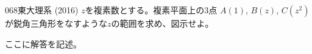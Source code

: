 \begin{prob}{068}{}{東大理系 (2016)}
 $z$を複素数とする。複素平面上の3点 $A(1)$, $B(z)$, $C(z^2)$ が鋭角三角形をなすような$z$の範囲を求め、図示せよ。
\end{prob}
ここに解答を記述。